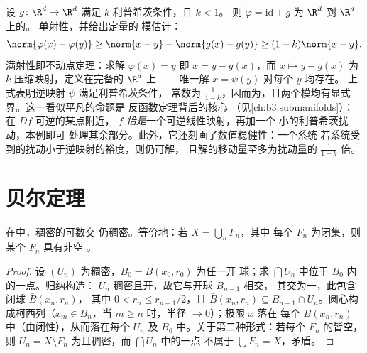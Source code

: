 \begin{example}[恒等映射的扰动]
\label{ex:b3:complete:perturbident}
设 $g \colon \R^d \to \R^d$ 满足 $k$-利普希茨条件，且 $k < 1$。
则 $\varphi = \mathrm{id} + g$ 为 $\R^d$ 到 $\R^d$ 上的\emph{}。
单射性，并给出定量的
模估计：
\[
\norm{\varphi(x) - \varphi(y)} \geq \norm{x - y} -
\norm{g(x) - g(y)} \geq (1 - k)\norm{x - y} .
\]
满射性即不动点定理：求解
$\varphi(x) = y$ 即 $x = y - g(x)$，而 $x \mapsto y -
g(x)$ 为 $k$-压缩映射，定义在完备的 $\R^d$ 上——
唯一解 $x = \psi(y)$ 对每个 $y$ 均存在。
上式表明逆映射 $\psi$ 满足利普希茨条件，
常数为 $\frac1{1-k}$，因而为，且两个模均有显式
界。这一看似平凡的命题是
反函数定理背后的核心
（见\cref{ch:b3:submanifolds}）：在 $Df$ 可逆的某点附近，
$f$ \emph{恰是}一个可逆线性映射，再加一个
小的利普希茨扰动，本例即可
处理其余部分。此外，它还刻画了数值稳健性：一个系统
若系统受到的扰动小于逆映射的裕度，则仍可解，
且解的移动量至多为扰动量的
$\frac{1}{1-k}$ 倍。
\end{example}

\section{贝尔定理}

\begin{theorem}[贝尔]\label{thm:b3:complete:baire}
在中，稠密的可数交
仍稠密。等价地：若 $X = \bigcup_{n}F_n$，其中
每个 $F_n$ 为闭集，则某个 $F_n$ 具有非空
。
\end{theorem}

\begin{proof}
设 $(U_n)$ 为稠密，$B_0 = B(x_0, r_0)$ 为任一开
球；求 $\bigcap U_n$ 中位于 $B_0$ 内的一点。归纳构造：
$U_{n}$ 稠密且开，故它与开球 $B_{n-1}$ 相交，
其交为一，此包含闭球 $\bar B(x_n, r_n)$，
其中 $0 < r_n \leq r_{n-1}/2$，且 $\bar B(x_n, r_n) \subseteq
B_{n-1}\cap U_n$。圆心构成柯西列（$x_m \in
B_n$，当 $m \geq n$ 时，半径 $\to 0$）；极限 $x$ 落在
每个 $\bar B(x_n, r_n)$ 中（由闭性），从而落在每个 $U_n$ 及
$B_0$ 中。关于第二种形式：若每个 $F_n$ 的皆空，则
$U_n = X \setminus F_n$ 为且稠密，而 $\bigcap U_n$ 中的一点
不属于 $\bigcup F_n = X$，矛盾。
\end{proof}

